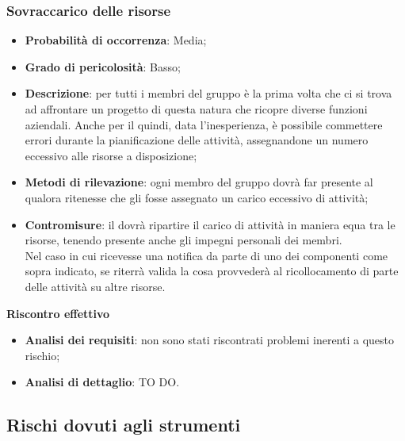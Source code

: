 		\subsubsection{Sovraccarico delle risorse} %
		\label{ssub:sovraccarico_delle_risorse}
			\begin{itemize}
				\item \textbf{Probabilità di occorrenza}: Media;
				\item \textbf{Grado di pericolosità}: Basso;
				\item \textbf{Descrizione}: per tutti i membri del gruppo è la prima volta che ci si trova ad affrontare un progetto di questa natura che ricopre diverse funzioni aziendali. Anche per il \roleProjectManager{} quindi, data l'inesperienza, è possibile commettere errori durante la pianificazione delle attività, assegnandone un numero eccessivo alle risorse a disposizione;
				\item \textbf{Metodi di rilevazione}: ogni membro del gruppo dovrà far presente al \roleProjectManager{} qualora ritenesse che gli fosse assegnato un carico eccessivo di attività;
				\item \textbf{Contromisure}: il \roleProjectManager{} dovrà ripartire il carico di attività in maniera equa tra le risorse, tenendo presente anche gli impegni personali dei membri. \\
				Nel caso in cui ricevesse una notifica da parte di uno dei componenti come sopra indicato, se riterrà valida la cosa provvederà al ricollocamento di parte delle attività su altre risorse.
			\end{itemize}
		\noindent
		\textbf{Riscontro effettivo}
			\begin{itemize}
				\item \textbf{Analisi dei requisiti}: non sono stati riscontrati problemi inerenti a questo rischio;
				\item \textbf{Analisi di dettaglio}: TO DO.
			\end{itemize}



	\subsection{Rischi dovuti agli strumenti} %
	\label{sub:rischi_dovuti_agli_strumenti}
